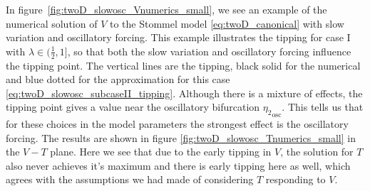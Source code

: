 \indent In figure~\ref{fig:twoD_slowosc_Vnumerics_small}, we see an example of the numerical solution of $V$ to the Stommel model \eqref{eq:twoD_canonical} with slow variation and oscillatory forcing. This example illustrates the tipping for case I with $\lambda\in (\frac{1}{2},1]$, so that both the slow variation and oscillatory forcing influence the tipping point. The vertical lines are the tipping, black solid for the numerical and blue dotted for the approximation for this case \eqref{eq:twoD_slowosc_subcaseII_tipping}. Although there is a mixture of effects, the tipping point gives a value near the oscillatory bifurcation ${\eta_2}_{\text{osc}}$. This tells us that for these choices in the model parameters the strongest effect is the oscillatory forcing. The results are shown in figure \eqref{fig:twoD_slowosc_Tnumerics_small} in the $V-T$ plane. Here we see that due to the early tipping in $V$, the solution for $T$ also never achieves it's maximum and there is early tipping here as well, which agrees with the assumptions we had made of considering $T$ responding to $V$.


